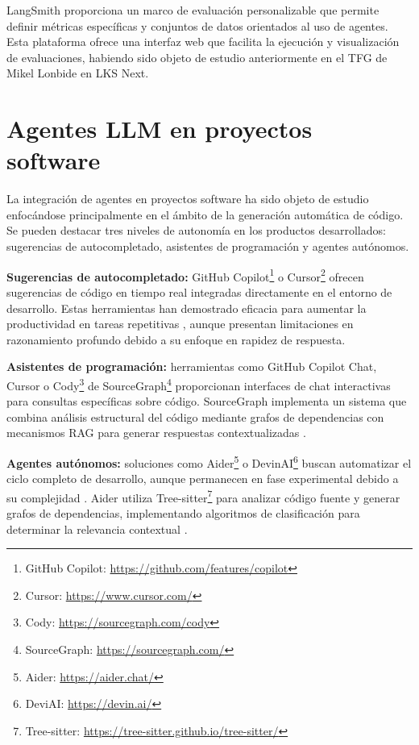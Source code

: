 LangSmith proporciona un marco de evaluación personalizable que permite definir métricas específicas y conjuntos de datos orientados al uso de agentes. Esta plataforma ofrece una interfaz web que facilita la ejecución y visualización de evaluaciones, habiendo sido objeto de estudio anteriormente en el TFG de Mikel Lonbide en LKS Next.

\section{Agentes LLM en proyectos software}
La integración de agentes en proyectos software ha sido objeto de estudio enfocándose principalmente en el ámbito de la generación automática de código. Se pueden destacar tres niveles de autonomía en los productos desarrollados: sugerencias de autocompletado, asistentes de programación y agentes autónomos.

\textbf{Sugerencias de autocompletado:} GitHub Copilot\footnote{GitHub Copilot: \url{https://github.com/features/copilot}} o Cursor\footnote{Cursor: \url{https://www.cursor.com/}} ofrecen sugerencias de código en tiempo real integradas directamente en el entorno de desarrollo. Estas herramientas han demostrado eficacia para aumentar la productividad en tareas repetitivas \cite{kalliamvakou_research_2022}, aunque presentan limitaciones en razonamiento profundo debido a su enfoque en rapidez de respuesta.

\textbf{Asistentes de programación:} herramientas como GitHub Copilot Chat, Cursor o Cody\footnote{Cody: \url{https://sourcegraph.com/cody}} de SourceGraph\footnote{SourceGraph: \url{https://sourcegraph.com/}} proporcionan interfaces de chat interactivas para consultas específicas sobre código. SourceGraph implementa un sistema que combina análisis estructural del código mediante grafos de dependencias con mecanismos RAG para generar respuestas contextualizadas \cite{sourcegraph2024cody}.

\textbf{Agentes autónomos:} soluciones como Aider\footnote{Aider: \url{https://aider.chat/}} o DevinAI\footnote{DeviAI: \url{https://devin.ai/}} buscan automatizar el ciclo completo de desarrollo, aunque permanecen en fase experimental debido a su complejidad \cite{acharya_devin_2025}. Aider utiliza Tree-sitter\footnote{Tree-sitter: \url{https://tree-sitter.github.io/tree-sitter/}} para analizar código fuente y generar grafos de dependencias, implementando algoritmos de clasificación para determinar la relevancia contextual \cite{gauthier_building_2023}.

